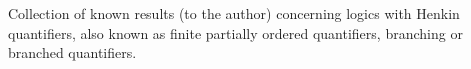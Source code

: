 Collection of known results (to the author) concerning logics with Henkin quantifiers, also known as finite partially ordered quantifiers, branching or branched quantifiers.

